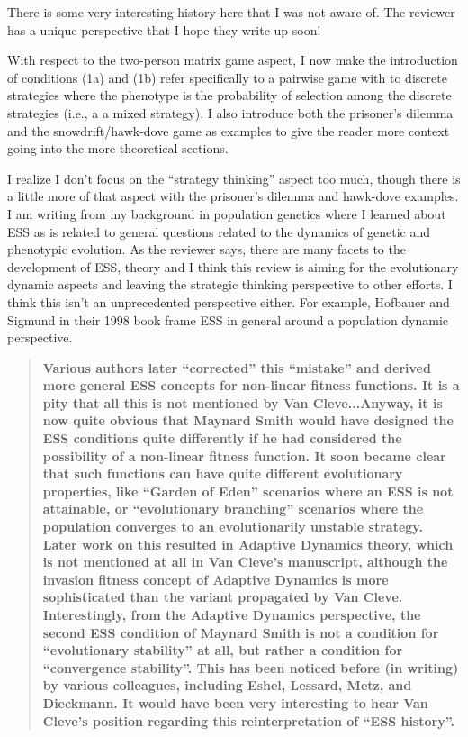 \documentclass[10pt,parskip=full,foldmarks=off,addrfield=off,backaddress=false,refline=dateleft,letterpaper]{scrlttr2}
\newenvironment{reviewerquote}{\begin{quote}\color{DarkBlue}\bfseries}{\end{quote}}
\begin{document}
\begin{letter}
There is some very interesting history here that I was not aware of. The reviewer has a unique perspective that I hope they write up soon!

With respect to the two-person matrix game aspect, I now make the introduction of conditions (1a) and (1b) refer specifically to a pairwise game with to discrete strategies where the phenotype is the probability of selection among the discrete strategies (i.e., a a mixed strategy). I also introduce both the prisoner's dilemma and the snowdrift/hawk-dove game as examples to give the reader more context going into the more theoretical sections.

I realize I don't focus on the ``strategy thinking'' aspect too much, though there is a little more of that aspect with the prisoner's dilemma and hawk-dove examples. I am writing from my background in population genetics where I learned about ESS as is related to general questions related to the dynamics of genetic and phenotypic evolution. As the reviewer says, there are many facets to the development of ESS, theory and I think this review is aiming for the evolutionary dynamic aspects and leaving the strategic thinking perspective to other efforts. I think this isn't an unprecedented perspective either. For example, Hofbauer and Sigmund in their 1998 book frame ESS in general around a population dynamic perspective.

\begin{reviewerquote}
  Various authors later “corrected” this “mistake” and derived more general ESS concepts for non-linear fitness functions. It is a pity that all this is not mentioned by Van Cleve...Anyway, it is now quite obvious that Maynard Smith would have designed the ESS conditions quite differently if he had considered the possibility of a non-linear fitness function. It soon became clear that such functions can have quite different evolutionary properties, like “Garden of Eden” scenarios where an ESS is not attainable, or “evolutionary branching” scenarios where the population converges to an evolutionarily unstable strategy. Later work on this resulted in Adaptive Dynamics theory, which is not mentioned at all in Van Cleve’s manuscript, although the invasion fitness concept of Adaptive Dynamics is more sophisticated than the variant propagated by Van Cleve. Interestingly, from the Adaptive Dynamics perspective, the second ESS condition of Maynard Smith is not a condition for “evolutionary stability” at all, but rather a condition for “convergence stability”. This has been noticed before (in writing) by various colleagues, including Eshel, Lessard, Metz, and Dieckmann. It would have been very interesting to hear Van Cleve’s position regarding this reinterpretation of “ESS history”.
\end{reviewerquote}


\end{letter}
\end{document}
